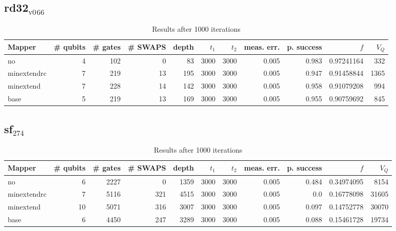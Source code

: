 \documentclass[11pt]{article}
\begin{document}
\subsection{rd32\(_{\text{v0}}\)\(_{\text{66}}\)}
\label{sec:orgf527a59}
\begin{table}[!htpb]
\caption{\label{tab:org5f87d92}
Results after 1000 iterations}
\centering
\begin{tabular}{lrrrrrrrrrr}
\hline
Mapper & \# qubits & \# gates & \# SWAPS & depth & \(t_1\) & \(t_2\) & meas. err. & p. success & \(f\) & \(V_Q\)\\
\hline
no & 4 & 102 & 0 & 83 & 3000 & 3000 & 0.005 & 0.983 & 0.97241164 & 332\\
\hline
minextendrc & 7 & 219 & 13 & 195 & 3000 & 3000 & 0.005 & 0.947 & 0.91458844 & 1365\\
minextend & 7 & 228 & 14 & 142 & 3000 & 3000 & 0.005 & 0.958 & 0.91079208 & 994\\
base & 5 & 219 & 13 & 169 & 3000 & 3000 & 0.005 & 0.955 & 0.90759692 & 845\\
\hline
\end{tabular}
\end{table}
\subsection{sf\(_{\text{274}}\)}
\label{sec:org414d93c}
\begin{table}[!htpb]
\caption{\label{tab:org31255d3}
Results after 1000 iterations}
\centering
\begin{tabular}{lrrrrrrrrrr}
\hline
Mapper & \# qubits & \# gates & \# SWAPS & depth & \(t_1\) & \(t_2\) & meas. err. & p. success & \(f\) & \(V_Q\)\\
\hline
no & 6 & 2227 & 0 & 1359 & 3000 & 3000 & 0.005 & 0.484 & 0.34974095 & 8154\\
\hline
minextendrc & 7 & 5116 & 321 & 4515 & 3000 & 3000 & 0.005 & 0.0 & 0.16778098 & 31605\\
minextend & 10 & 5071 & 316 & 3007 & 3000 & 3000 & 0.005 & 0.097 & 0.14752778 & 30070\\
base & 6 & 4450 & 247 & 3289 & 3000 & 3000 & 0.005 & 0.088 & 0.15461728 & 19734\\
\hline
\end{tabular}
\end{table}
\end{document}

